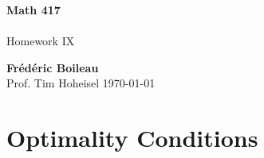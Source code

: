 \documentclass{article}
\begin{document}
	\begin{titlepage}
		\begin{center}
			\vspace*{1cm}
			\textbf{Math 417}\\
			\\
			\vspace{0.5cm}
			Homework IX
			
			\vspace{1.5cm}
			
			\textbf{Frédéric Boileau}\\
			\vspace{2cm}
			Prof. 
			Tim Hoheisel
			\vfill
			\today
			\thispagestyle{empty}
		\end{center}
	\end{titlepage}
	\newpage
	\tableofcontents
	\thispagestyle{empty}
	\clearpage
	
	\section{Optimality Conditions}
	
\end{document}
